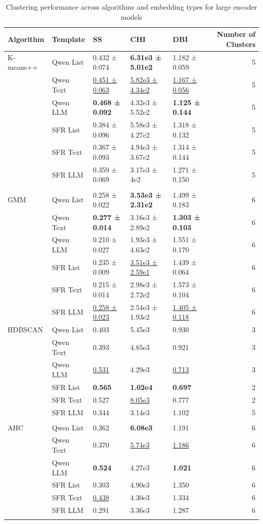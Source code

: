 \begin{table}[!h]
\centering
\caption{Clustering performance across algorithms and embedding types for large encoder models}
\centering
\begin{tabular}[t]{lllllr}
\toprule
Algorithm & Template & SS & CHI & DBI & Number of Clusters\\
\midrule
K-means++ & Qwen List & 0.432 ± 0.074 & \textbf{6.31e3 ± 5.01e2} & 1.182 ± 0.059 & 5\\
 & Qwen Text & \underline{0.451 ± 0.063} & \underline{5.82e3 ± 4.34e2} & \underline{1.167 ± 0.056} & 5\\
 & Qwen LLM & \textbf{0.468 ± 0.092} & 4.32e3 ± 5.52e2 & \textbf{1.125 ± 0.144} & 5\\
 & SFR List & 0.384 ± 0.096 & 5.58e3 ± 4.27e2 & 1.318 ± 0.132 & 5\\
 & SFR Text & 0.367 ± 0.093 & 4.94e3 ± 3.67e2 & 1.314 ± 0.144 & 5\\
\addlinespace
 & SFR LLM & 0.359 ± 0.069 & 3.17e3 ± 4e2 & 1.271 ± 0.150 & 5\\
\midrule\\
GMM & Qwen List & 0.258 ± 0.022 & \textbf{3.53e3 ± 2.31e2} & 1.499 ± 0.183 & 6\\
 & Qwen Text & \textbf{0.277 ± 0.014} & 3.16e3 ± 2.89e2 & \textbf{1.303 ± 0.103} & 6\\
 & Qwen LLM & 0.210 ± 0.027 & 1.93e3 ± 4.63e2 & 1.551 ± 0.170 & 6\\
 & SFR List & 0.235 ± 0.009 & \underline{3.51e3 ± 2.59e1} & 1.439 ± 0.064 & 6\\
\addlinespace
 & SFR Text & 0.215 ± 0.014 & 2.98e3 ± 2.72e2 & 1.573 ± 0.104 & 6\\
 & SFR LLM & \underline{0.258 ± 0.023} & 2.54e3 ± 1.93e2 & \underline{1.405 ± 0.118} & 6\\
\midrule
HDBSCAN & Qwen List & 0.403 & 5.45e3 & 0.930 & 3\\
 & Qwen Text & 0.393 & 4.85e3 & 0.921 & 3\\
 & Qwen LLM & \underline{0.531} & 4.29e3 & \underline{0.713} & 3\\
\addlinespace
 & SFR List & \textbf{0.565} & \textbf{1.02e4} & \textbf{0.697} & 2\\
 & SFR Text & 0.527 & \underline{8.05e3} & 0.777 & 2\\
 & SFR LLM & 0.344 & 3.14e3 & 1.102 & 5\\
\midrule\\
AHC & Qwen List & 0.362 & \textbf{6.08e3} & 1.191 & 6\\
 & Qwen Text & 0.370 & \underline{5.74e3} & \underline{1.186} & 6\\
\addlinespace
 & Qwen LLM & \textbf{0.524} & 4.27e3 & \textbf{1.021} & 6\\
 & SFR List & 0.303 & 4.90e3 & 1.350 & 6\\
 & SFR Text & \underline{0.438} & 4.30e3 & 1.334 & 6\\
 & SFR LLM & 0.291 & 3.36e3 & 1.287 & 6\\
\midrule\\
\bottomrule
\end{tabular}
\end{table}

